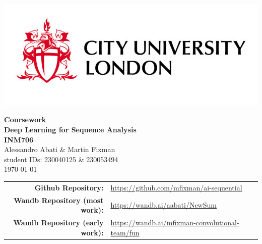 \documentclass[a4paper, 11pt]{article}
\begin{document}
\begin{titlepage}
    \begin{minipage}{0.5\textwidth}
        \vspace{-2cm}
        \hspace{-1cm}
        \includegraphics[width=1\textwidth]{uni_logo.jpg}
    \end{minipage}
    \begin{center}
        \vspace{6cm}
        \begin{minipage}{0.7\textwidth}
        \centering
        {\huge\bfseries Coursework \vspace{10pt}\\ Deep Learning for Sequence Analysis  \vspace{10pt} \\ INM706}\\[2ex]
        \vspace{15pt}
        {\LARGE Alessandro Abati \& Martin Fixman}\\[1ex]
        {\large student IDs: 230040125 \& 230053494}\\[1ex]
        {\Large \today}
        \end{minipage}
    \end{center}
	\vfill
    \begin{center}
		\small
		\begin{tabular}{r l}
			\textbf{Github Repository:} & \url{https://github.com/mfixman/ai-sequential} \\
			\textbf{Wandb Repository (most work):} & \url{https://wandb.ai/aabati/NewSum} \\
			\textbf{Wandb Repository (early work):} & \url{https://wandb.ai/mfixman-convolutional-team/fun}
		\end{tabular}
    \end{center}
\end{titlepage}

\clearpage{}
\thispagestyle{empty}
\tableofcontents
\end{document}
